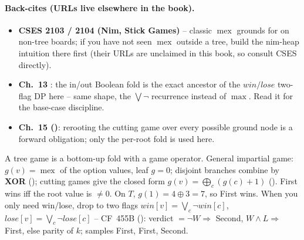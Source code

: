 \paragraph{Back-cites (URLs live elsewhere in the book).}
\begin{itemize}[nosep,leftmargin=1.4em]
  \item \textbf{CSES 2103 / 2104 (Nim, Stick Games)} -- classic $\operatorname{mex}$ grounds for
         on non-tree boards; if you have not seen $\operatorname{mex}$ outside a
        tree, build the nim-heap intuition there first (their URLs are unclaimed in this
        book, so consult CSES directly).
  \item \textbf{Ch.~13 }: the in/out Boolean fold is the exact
        ancestor of the $\mathit{win}/\mathit{lose}$ two-flag DP here -- same shape, the
        $\bigvee\neg$ recurrence instead of $\max$. Read it for the base-case discipline.
  \item \textbf{Ch.~15 ()}: rerooting the cutting game over every possible
        ground node is a forward obligation; only the per-root fold
         is used here.
\end{itemize}

\begin{recallbox}
A tree game is a bottom-up fold with a game operator. General impartial game:
$g(v) = \operatorname{mex}$ of the option values, leaf $g=0$; disjoint branches combine by
\textbf{XOR} (); cutting games give the closed form
$g(v) = \bigoplus_c (g(c)+1)$ (). First wins iff the root value is
$\ne 0$. On $T$, $g(1) = 4 \oplus 3 = 7$, so First wins. When you only need win/lose, drop
to two flags $\mathit{win}[v] = \bigvee_c \neg\mathit{win}[c]$, $\mathit{lose}[v] =
\bigvee_c \neg\mathit{lose}[c]$ -- CF~455B (): verdict $= \neg W
\Rightarrow$ Second, $W \wedge L \Rightarrow$ First, else parity of $k$; samples First,
First, Second.
\end{recallbox}

